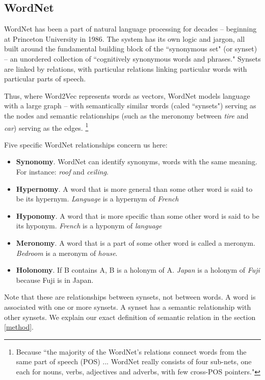 \documentclass[titlepage]{article}
\begin{document}
\subsection{WordNet}  \label{WordNet}
WordNet has been a part of natural language processing for decades -- beginning at Princeton University in 1986. The system has its own logic and jargon, all built around the fundamental building block \cite{wordnet} of the ``synonymous set" (or synset) -- an unordered collection of ``cognitively synonymous words and phrases." \cite{cruse} Synsets are linked by relations, with particular relations linking particular words with particular parts of speech.

Thus, where Word2Vec represents words as vectors, WordNet models language with a large graph -- with semantically similar words (caled ``synsets") serving as the nodes and semantic relationships (such as the meronomy between \textit{tire} and \textit{car}) serving as the edges. \footnote{Because ``the majority of the WordNet’s relations connect words from the same part of speech (POS) ... WordNet really consists of four sub-nets, one each for nouns, verbs, adjectives and adverbs, with few cross-POS pointers."\cite{Wordnetwebsite}}

Five specific WordNet relationships concern us here:

\begin{itemize}

  \item \textbf{Synonomy}. WordNet can identify synonyms, words with the same meaning. For instance: \textit{roof} and \textit{ceiling}.
  \item \textbf{Hypernomy}. A word that is more general than some other word is said to be its hypernym. \textit{Language} is a hypernym of \textit{French}
  \item \textbf{Hyponomy}. A word that is more specific than some other word is said to be its hyponym. \textit{French} is a hyponym of \textit{language}
  \item \textbf{Meronomy}. A word that is a part of some other word is called a meronym. \textit{Bedroom} is a meronym of \textit{house}.
  \item \textbf{Holonomy}. If B contains A, B is a holonym of A. \textit{Japan} is a holonym of \textit{Fuji} because Fuji is in Japan.
\end{itemize}

Note that these are relationships between synsets, not between words. A word is associated with one or more synsets. A synset has a semantic relationship with other synsets. We explain our exact definition of semantic relation in the section \ref{method}.
\end{document}

